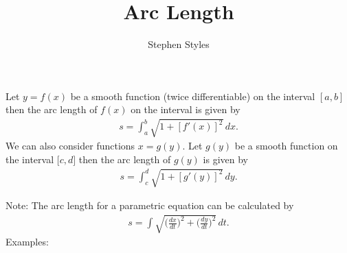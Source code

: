 \documentclass[16pt]{article}
\title{Arc Length}
\author{Stephen Styles}
\theoremstyle{remark}
\begin{document}
\maketitle


Let $y = f(x)$ be a smooth function (twice differentiable) on the interval ${[ a, b ]}$ then the arc length of $f(x)$ on the interval is given by 
\begin{align*}
s = \int_a^b \sqrt{1+{[f'(x)]}^2} \, dx.
\end{align*} 
We can also consider functions $x=g(y)$. Let $g(y)$ be a smooth function on the interval ${[c,d}]$ then the arc length of $g(y)$ is given by
\begin{align*}
s = \int_c^d \sqrt{1+{[g'(y)]}^2} \, dy.
\end{align*}

Note: The arc length for a parametric equation can be calculated by
\begin{align*}
s = \int \sqrt{\bigg(\frac{dx}{dt}\bigg)^2+\bigg(\frac{dy}{dt}\bigg)^2} \, dt.
\end{align*}
Examples:
\end{document}
